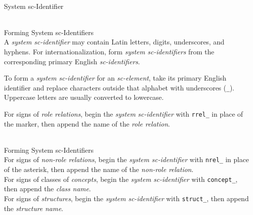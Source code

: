 \begin{frame}{\\System sc-Identifier}
	\topline
	\justifying
	\begin{SCn}
	\end{SCn}

\end{frame}

\begin{frame}{\\Forming System sc-Identifiers}
	\topline
	\justifying
	\vspace*{\fill}\\
	\footnotesize
	A \textit{system sc-identifier} may contain Latin letters, digits, underscores, and hyphens. For internationalization, form \textit{system sc-identifiers} from the corresponding primary English \textit{sc-identifiers}.

	\bigskip
	To form a \textit{system sc-identifier} for an \textit{sc-element}, take its primary English identifier and replace characters outside that alphabet with underscores (\texttt{\_}). Uppercase letters are usually converted to lowercase.

	\bigskip
	For signs of \textit{role relations}, begin the \textit{system sc-identifier} with \texttt{rrel\_} in place of the \scnrolesign{} marker, then append the name of the \textit{role relation}.

\end{frame}

\begin{frame}{\\Forming System sc-Identifiers}
	\topline
	\justifying
	\vspace*{\fill}\\
	 For signs of \textit{non-role relations}, begin the \textit{system sc-identifier} with \texttt{nrel\_} in place of the asterisk, then append the name of the \textit{non-role relation}.\\

	\bigskip
	For signs of classes of \textit{concepts}, begin the \textit{system sc-identifier} with \texttt{concept\_}, then append the \textit{class name}.\\

	\bigskip
	For signs of \textit{structures}, begin the \textit{system sc-identifier} with \texttt{struct\_}, then append the \textit{structure name}.
\end{frame}

